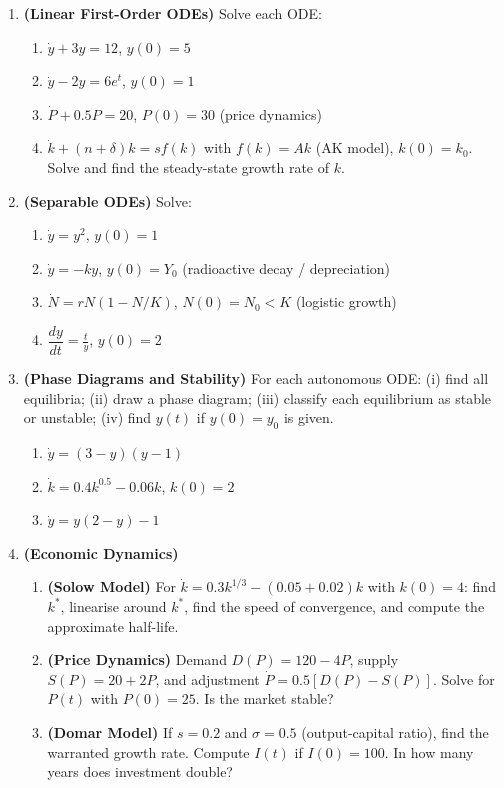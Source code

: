 \documentclass[12pt, a4paper]{article}
\theoremstyle{definition}
\newcommand{\ddd}[2]{\dfrac{d#1}{d#2}}
\begin{document}
\begin{enumerate}[label=\textbf{B\arabic*.},leftmargin=2.5em]

\item \textbf{(Linear First-Order ODEs)} Solve each ODE:
\begin{enumerate}[label=(\alph*)]
  \item $\dot y + 3y = 12$, \quad $y(0) = 5$
  \item $\dot y - 2y = 6e^t$, \quad $y(0) = 1$
  \item $\dot P + 0.5P = 20$, \quad $P(0) = 30$ \quad (price dynamics)
  \item $\dot k + (n+\delta)k = sf(k)$ with $f(k) = Ak$ (AK model),
        $k(0)=k_0$. Solve and find the steady-state growth rate of $k$.
\end{enumerate}

\item \textbf{(Separable ODEs)} Solve:
\begin{enumerate}[label=(\alph*)]
  \item $\dot y = y^2$, \quad $y(0) = 1$
  \item $\dot y = -ky$, \quad $y(0) = Y_0$ \quad (radioactive decay / depreciation)
  \item $\dot N = rN(1-N/K)$, \quad $N(0)=N_0<K$ \quad (logistic growth)
  \item $\ddd{y}{t} = \frac{t}{y}$, \quad $y(0)=2$
\end{enumerate}

\item \textbf{(Phase Diagrams and Stability)} For each autonomous ODE:
(i) find all equilibria; (ii) draw a phase diagram; (iii) classify each
equilibrium as stable or unstable; (iv) find $y(t)$ if $y(0)=y_0$ is given.
\begin{enumerate}[label=(\alph*)]
  \item $\dot y = (3-y)(y-1)$
  \item $\dot k = 0.4k^{0.5} - 0.06k$, \quad $k(0)=2$
  \item $\dot y = y(2-y) - 1$
\end{enumerate}

\item \textbf{(Economic Dynamics)}
\begin{enumerate}[label=(\alph*)]
  \item \textbf{(Solow Model)} For $\dot k = 0.3k^{1/3}-(0.05+0.02)k$
        with $k(0)=4$: find $k^*$, linearise around $k^*$, find the speed
        of convergence, and compute the approximate half-life.
  \item \textbf{(Price Dynamics)} Demand $D(P)=120-4P$, supply
        $S(P)=20+2P$, and adjustment $\dot P=0.5[D(P)-S(P)]$.
        Solve for $P(t)$ with $P(0)=25$. Is the market stable?
  \item \textbf{(Domar Model)} If $s=0.2$ and $\sigma=0.5$ (output-capital
        ratio), find the warranted growth rate. Compute $I(t)$ if
        $I(0)=100$. In how many years does investment double?
\end{enumerate}

\end{enumerate}
\end{document}
